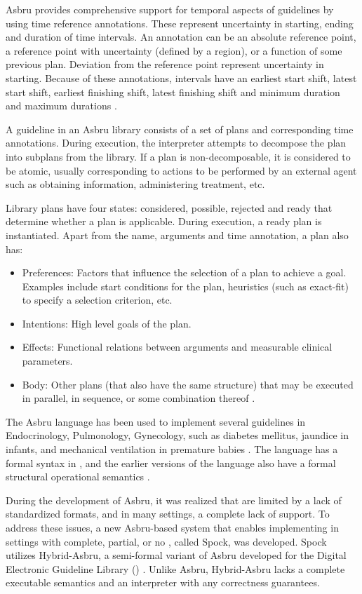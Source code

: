 Asbru provides comprehensive support for temporal aspects of guidelines by using
time reference annotations.
These represent uncertainty in starting, ending and duration
of time intervals. An annotation can be an absolute reference point,
a reference point with uncertainty (defined by a region), or a function of
some previous plan. Deviation from the reference point represent uncertainty
in starting. Because of these annotations, intervals have an
earliest start shift, latest start shift, earliest finishing shift, latest
finishing shift and minimum duration and maximum durations \cite{ShaharAIM98}.

A guideline in an Asbru library consists of a set
of plans and corresponding time annotations. During execution,
the interpreter attempts to decompose the plan into subplans from the library.
If a plan is non-decomposable, it is considered to be atomic, usually corresponding
to actions to be performed by an external agent such as obtaining information,
administering treatment, etc.

Library plans have four states: considered, possible, rejected and ready that
determine whether a plan is applicable. During execution, a ready plan is
instantiated. Apart from the name, arguments and time annotation, a plan also has:
\begin{itemize}
  \item Preferences: Factors that influence the selection of a plan to
    achieve a goal. Examples include start conditions for the plan,
    heuristics (such as exact-fit) to specify a selection criterion, etc.
  \item Intentions: High level goals of the plan.
  \item Effects: Functional relations between arguments and measurable
    clinical parameters.
  \item Body: Other plans (that also have the same structure) that may be
    executed in parallel, in sequence, or some combination thereof
    \cite{ShaharAIM98}.
\end{itemize}

The Asbru language has been used to implement several guidelines in
Endocrinology, Pulmonology, Gynecology, such as diabetes mellitus, jaundice in
infants, and mechanical ventilation in premature babies
\cite{YoungAMIA05}. The language has a formal syntax in \BNF{}, and the earlier versions of the language
also have a formal structural operational semantics \cite{BalserPIDP02}.

During the development of Asbru, it was realized that
\CDSSs{} are limited by a lack of standardized \EHR{} formats, and in many
settings, a complete lack of \EHR{} support. To address these issues,
a new Asbru-based system that enables implementing \CDSSs{} in
settings with complete, partial, or no \EHR{}, called Spock, was developed.
Spock utilizes Hybrid-Asbru, a semi-formal variant of Asbru developed
for the Digital Electronic Guideline Library (\DEGEL{}) \cite{YoungAMIA05,YoungAIM05}.
Unlike Asbru, Hybrid-Asbru lacks a complete executable semantics and an
interpreter with any correctness guarantees.

